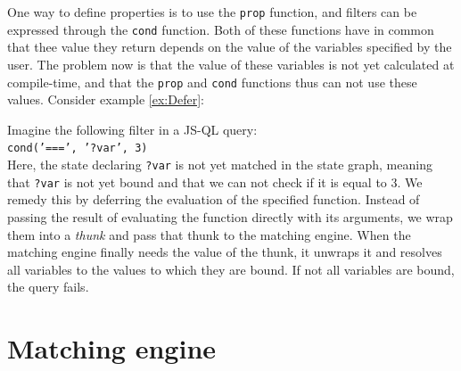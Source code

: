 One way to define properties is to use the \texttt{prop} function, and filters can be expressed through the \texttt{cond} function. Both of these functions have in common that thee value they return depends on the value of the variables specified by the user. The problem now is that the value of these variables is not yet calculated at compile-time, and that the \texttt{prop} and \texttt{cond} functions thus can not use these values.
Consider example \ref{ex:Defer}:
\begin{exmp}
\label{ex:Defer}
Imagine the following filter in a JS-QL query: \\\texttt{cond('===', '?var', 3)} \\Here, the state declaring \texttt{?var} is not yet matched in the state graph, meaning that \texttt{?var} is not yet bound and that we can not check if it is equal to 3. We remedy this by deferring the evaluation of the specified function. Instead of passing the result of evaluating the function directly with its arguments, we wrap them into a \textit{thunk} and pass that thunk to the matching engine. When the matching engine finally needs the value of the thunk, it unwraps it and resolves all variables to the values to which they are bound. If not all variables are bound, the query fails.
\end{exmp}

\section{Matching engine}
\label{sec:matchingEngine}

